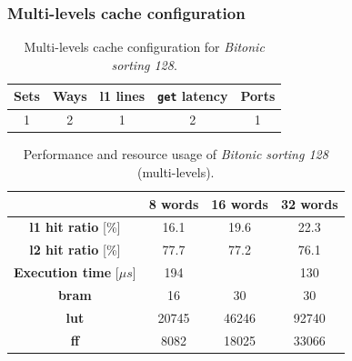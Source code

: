 \documentclass[11pt,a4paper,oneside]{memoir}
\begin{document}
\subsubsection{Multi-levels cache configuration}
\begin{table}[H]
	\begin{center}
		\begin{tabular}{ccccc}
			\hline
			\rowcolor{gray!50}
			\textbf{Sets} & \textbf{Ways} & \textbf{\ac{l1} lines} &
			\textbf{\texttt{get} latency} & \textbf{Ports} \\
			\hline
			1 & 2 & 1 & 2 & 1 \\
			\hline
		\end{tabular}
	\end{center}
	\caption{Multi-levels cache configuration for \emph{Bitonic sorting 128}.}
	\label{tab:bitonic_128_l1_config}
\end{table}

\begin{table}[H]
	\begin{center}
		\begin{tabular}{cccc}
			\hline
			\rowcolor{gray!50}
			& \textbf{8 words} & \textbf{16 words} & \textbf{32 words} \\
			\hline
			\textbf{\ac{l1} hit ratio} [\%] & 16.1 & 19.6 & 22.3 \\
			\rowcolor{gray!25}
			\textbf{\ac{l2} hit ratio} [\%] & 77.7 & 77.2 & 76.1 \\
			\textbf{Execution time} [$\mu s$] & 194 & & 130 \\
			\rowcolor{gray!25}
			\textbf{\ac{bram}} & 16 & 30 & 30 \\
			\textbf{\acs{lut}} & 20745 & 46246 & 92740 \\
			\rowcolor{gray!25}
			\textbf{\acs{ff}} & 8082 & 18025 & 33066 \\
			\hline
		\end{tabular}
	\end{center}
	\caption{Performance and resource usage of \emph{Bitonic sorting 128} (multi-levels).}
	\label{tab:bitonic_128_l1_report}
\end{table}
\end{document}
